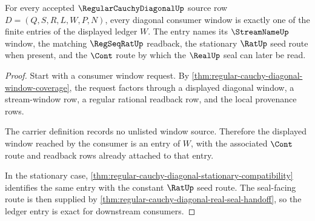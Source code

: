 \begin{theorem}
\label{thm:regular-cauchy-diagonal-window-ledger-exactness}
For every accepted $\RegularCauchyDiagonalUp$ source row $D=(Q,S,R,L,W,P,N)$, every diagonal consumer window is exactly one of the finite entries of the displayed ledger $W$. The entry names its $\StreamNameUp$ window, the matching $\RegSeqRatUp$ readback, the stationary $\RatUp$ seed route when present, and the $\Cont$ route by which the $\RealUp$ seal can later be read.
\end{theorem}
\begin{proof}
Start with a consumer window request. By \autoref{thm:regular-cauchy-diagonal-window-coverage}, the request factors through a displayed diagonal window, a stream-window row, a regular rational readback row, and the local provenance rows.

The carrier definition records no unlisted window source. Therefore the displayed window reached by the consumer is an entry of $W$, with the associated $\Cont$ route and readback rows already attached to that entry.

In the stationary case, \autoref{thm:regular-cauchy-diagonal-stationary-compatibility} identifies the same entry with the constant $\RatUp$ seed route. The seal-facing route is then supplied by \autoref{thm:regular-cauchy-diagonal-real-seal-handoff}, so the ledger entry is exact for downstream consumers.
\end{proof}

